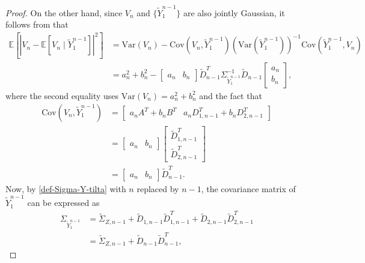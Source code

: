 \documentclass[12pt]{article}
\newcommand{\E}{\mathbb{E}}
\begin{document}
\begin{proof}
On the other hand, since $V_n$ and $\{\widetilde{Y}_1^{n-1}\}$ are also jointly Gaussian, it follows from \cite[Theorem 4.6]{gray2004introduction} that
\begin{equation}\label{MMSE-Vn}
\begin{aligned}
\E[| V_n-\E[V_n\mid \widetilde{Y}_1^{n-1}]|^2]&= \mathrm{Var}(V_n) - \mathrm{Cov}(V_n,\widetilde{Y}_1^{n-1})\left(\mathrm{Var}(\widetilde{Y}_1^{n-1})\right)^{-1}\mathrm{Cov}(\widetilde{Y}_1^{n-1},V_n) \\
&= a_n^2 +b_n^2 -\begin{bmatrix}a_n&b_n\end{bmatrix}\widetilde{D}^T_{n-1}\Sigma_{\widetilde{Y}_1^{n-1}}^{-1}\widetilde{D}_{n-1}\begin{bmatrix}a_n\\[2pt]b_n\end{bmatrix},
\end{aligned}
\end{equation}
where the second equality uses $\mathrm{Var}(V_n)=a_n^2+b_n^2$ and the fact that
\begin{equation*}
\begin{aligned}
   \mathrm{Cov}(V_n,\widetilde{Y}_1^{n-1}) &= \begin{bmatrix}a_n A^T+b_nB^T& a_nD_{1,n-1}^T+b_nD_{2,n-1}^T\end{bmatrix}\\
   &=\begin{bmatrix}a_n &b_n \end{bmatrix}\begin{bmatrix}\widetilde{D}^T_{1,n-1}\\[2pt]\widetilde{D}^T_{2,n-1}\end{bmatrix}\\
   &=\begin{bmatrix}a_n&b_n\end{bmatrix}\widetilde{D}^T_{n-1}.
\end{aligned}
\end{equation*}
Now, by \eqref{def-Sigma-Y-tilta} with $n$ replaced by $n-1$, the covariance matrix of $\widetilde{Y}_1^{n-1}$ can be expressed as
\begin{equation*}
\begin{aligned}
   \Sigma_{\widetilde{Y}_1^{n-1}}&=\widetilde{\Sigma}_{Z,n-1}+\widetilde{D}_{1,n-1}\widetilde{D}^T_{1,n-1}+\widetilde{D}_{2,n-1}\widetilde{D}^T_{2,n-1}\\
&=\widetilde{\Sigma}_{Z,n-1}+\widetilde{D}_{n-1}\widetilde{D}^T_{n-1},
\end{aligned}

\end{equation*}
\end{proof}
\end{document}
